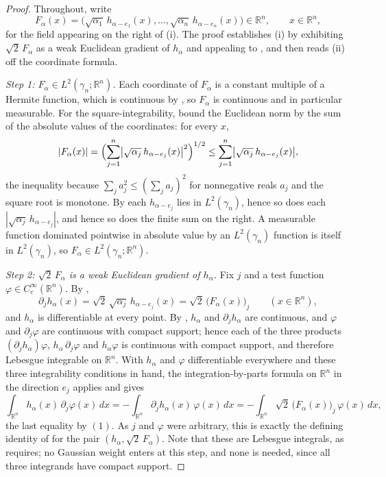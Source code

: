 \begin{proof}
Throughout, write
\[
  F_\alpha(x) = \bigl(\sqrt{\alpha_1}\,h_{\alpha-e_1}(x), \ldots,
                      \sqrt{\alpha_n}\,h_{\alpha-e_n}(x)\bigr)
  \in \mathbb{R}^n , \qquad x \in \mathbb{R}^n ,
\]
for the field appearing on the right of (i).  The proof establishes (i) by
exhibiting $\sqrt2\,F_\alpha$ as a weak Euclidean gradient of $h_\alpha$ and
appealing to , and then reads (ii) off the coordinate
formula.

\emph{Step 1: $F_\alpha \in L^2(\gamma_n;\mathbb{R}^n)$.}
Each coordinate of $F_\alpha$ is a constant multiple of a Hermite function, which
is continuous by , so $F_\alpha$ is continuous and in
particular measurable.  For the square-integrability, bound the Euclidean norm by
the sum of the absolute values of the coordinates: for every $x$,
\[
  |F_\alpha(x)|
    = \Bigl(\sum_{j=1}^n \bigl|\sqrt{\alpha_j}\,h_{\alpha-e_j}(x)\bigr|^2\Bigr)^{1/2}
    \leq \sum_{j=1}^n \bigl|\sqrt{\alpha_j}\,h_{\alpha-e_j}(x)\bigr| ,
\]
the inequality because $\sum_j a_j^2 \leq (\sum_j a_j)^2$ for nonnegative reals
$a_j$ and the square root is monotone.  By  each
$h_{\alpha-e_j}$ lies in $L^2(\gamma_n)$, hence so does each
$|\sqrt{\alpha_j}\,h_{\alpha-e_j}|$, and hence so does the finite sum on the
right.  A measurable function dominated pointwise in absolute value by an
$L^2(\gamma_n)$ function is itself in $L^2(\gamma_n)$, so
$F_\alpha \in L^2(\gamma_n;\mathbb{R}^n)$.

\emph{Step 2: $\sqrt2\,F_\alpha$ is a weak Euclidean gradient of $h_\alpha$.}
Fix $j$ and a test function $\varphi \in C_c^\infty(\mathbb{R}^n)$.  By
,
\begin{equation*}
  \partial_j h_\alpha(x) = \sqrt2\,\sqrt{\alpha_j}\,h_{\alpha-e_j}(x)
    = \sqrt2\,\bigl(F_\alpha(x)\bigr)_j
  \qquad (x \in \mathbb{R}^n), \tag{1}
\end{equation*}
and $h_\alpha$ is differentiable at every point.  By
, $h_\alpha$ and $\partial_j h_\alpha$ are
continuous, and $\varphi$ and $\partial_j \varphi$ are continuous with compact
support; hence each of the three products
$(\partial_j h_\alpha)\varphi$, $h_\alpha\,\partial_j\varphi$ and
$h_\alpha\varphi$ is continuous with compact support, and therefore Lebesgue
integrable on $\mathbb{R}^n$.  With $h_\alpha$ and $\varphi$ differentiable
everywhere and these three integrability conditions in hand, the integration-by-parts
formula on $\mathbb{R}^n$ in the direction $e_j$ applies and gives
\[
  \int_{\mathbb{R}^n} h_\alpha(x)\,\partial_j\varphi(x)\,dx
    = -\int_{\mathbb{R}^n} \partial_j h_\alpha(x)\,\varphi(x)\,dx
    = -\int_{\mathbb{R}^n} \sqrt2\,\bigl(F_\alpha(x)\bigr)_j\,\varphi(x)\,dx ,
\]
the last equality by $(1)$.  As $j$ and $\varphi$ were arbitrary, this is exactly
the defining identity of  for the pair
$(h_\alpha, \sqrt2\,F_\alpha)$.  Note that these are Lebesgue integrals, as
 requires; no Gaussian weight enters at this step, and
none is needed, since all three integrands have compact support.


\end{proof}

